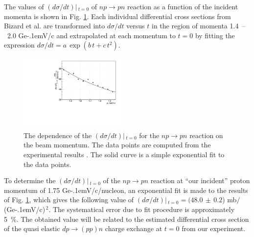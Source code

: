 \documentclass[twocolumn,epjc3]{svjour3}
\newcommand{\np}     {\ensuremath{np \rightarrow pn}\xspace}
\newcommand{\dpchex} {\ensuremath{dp \rightarrow (pp)n}\xspace}
\newcommand{\GeVc}   {Ge\kern-.1emV/c\xspace}
\begin{document}
The values of $(d\sigma/dt)|\,_{t=0}$ of \np reaction as a function of the
incident momenta is shown in Fig. \ref{fig:npsigma}. Each individual
differential cross sections from Bizard et al. \cite{biz75} are transformed into
$d\sigma/dt$ versus $t$ in the region of momenta 1.4~--~2.0 \GeVc and
extrapolated at each momentum to $t=0$ by fitting the expression
$d\sigma/dt = a\,\exp(b\,t + c\,t^2)$. %

\begin{figure}[ht]
  \centering
  \includegraphics[width=0.48\textwidth]{np_dSigma.pdf}
  \caption{The dependence of the $(d\sigma/dt)|\,_{t=0}$ for the \np reaction on
    the beam momentum. The data points are computed from the experimental
    results \cite{biz75}. The solid curve is a simple exponential fit to the
    data points.}
  \label{fig:npsigma}
\end{figure}

To determine the $(d\sigma/dt)|\,_{t=0}$ of the \np reaction at ``our incident''
proton momentum of 1.75 \GeVc/nucleon, an exponential fit is made to the results
of Fig. \ref{fig:npsigma}, which gives the following value of
$(d\sigma/dt)|\,_{t=0} = (48.0\,\pm\,0.2$) mb$/$(\GeVc)$^{\,2}$. The systematical
error due to fit procedure is approximately 5~\%. The obtained value will be
related to the estimated differential cross section of the quasi elastic \dpchex
charge exchange at $t=0$ from our experiment.
\end{document}

